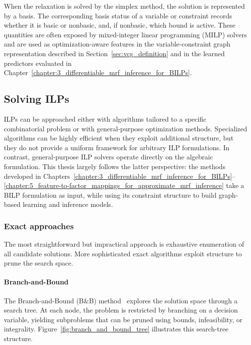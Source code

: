 When the relaxation is solved by the simplex method, the solution is represented by a basis. The corresponding basis status of a variable or constraint records whether it is basic or nonbasic, and, if nonbasic, which bound is active. These quantities are often exposed by mixed-integer linear programming (MILP) solvers and are used as optimization-aware features in the variable-constraint graph representation described in Section~\ref{sec:vcg_definition} and in the learned predictors evaluated in Chapter~\ref{chapter:3_differentiable_mrf_inference_for_BILPs}.


\subsection{Solving ILPs}

ILPs can be approached either with algorithms tailored to a specific combinatorial problem or with general-purpose optimization methods. Specialized algorithms can be highly efficient when they exploit additional structure, but they do not provide a uniform framework for arbitrary ILP formulations. In contrast, general-purpose ILP solvers operate directly on the algebraic formulation. This thesis largely follows the latter perspective: the methods developed in Chapters~\ref{chapter:3_differentiable_mrf_inference_for_BILPs}--\ref{chapter:5_feature-to-factor_mappings_for_approximate_mrf_inference} take a BILP formulation as input, while using its constraint structure to build graph-based learning and inference models.

\subsubsection{Exact approaches}
The most straightforward but impractical approach is exhaustive enumeration of all candidate solutions. More sophisticated exact algorithms exploit structure to prune the search space.

\paragraph{Branch-and-Bound} The Branch-and-Bound (B\&B) method~\cite{land_automatic_1960,dakin_tree-search_1965} explores the solution space through a search tree. At each node, the problem is restricted by branching on a decision variable, yielding subproblems that can be pruned using bounds, infeasibility, or integrality. Figure~\ref{fig:branch_and_bound_tree} illustrates this search-tree structure.

